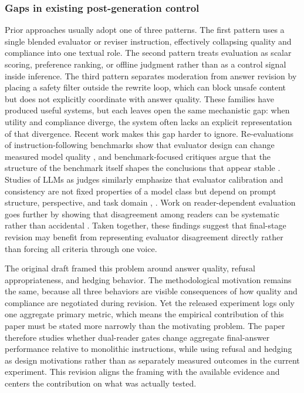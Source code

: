 \documentclass{article}
\begin{document}
\subsubsection{Gaps in existing post-generation control}

\label{sec:gaps_in_existing_post_generation_control}

Prior approaches usually adopt one of three patterns. The first pattern uses a single blended evaluator or reviser instruction, effectively collapsing quality and compliance into one textual role. The second pattern treats evaluation as scalar scoring, preference ranking, or offline judgment rather than as a control signal inside inference. The third pattern separates moderation from answer revision by placing a safety filter outside the rewrite loop, which can block unsafe content but does not explicitly coordinate with answer quality. These families have produced useful systems, but each leaves open the same mechanistic gap: when utility and compliance diverge, the system often lacks an explicit representation of that divergence. Recent work makes this gap harder to ignore. Re-evaluations of instruction-following benchmarks show that evaluator design can change measured model quality \cite{liu2024reife}, and benchmark-focused critiques argue that the structure of the benchmark itself shapes the conclusions that appear stable \cite{zhu2026benchmark}. Studies of LLMs as judges similarly emphasize that evaluator calibration and consistency are not fixed properties of a model class but depend on prompt structure, perspective, and task domain \cite{zhou2025evaluating}, \cite{zhang2024evaluation}. Work on reader-dependent evaluation goes further by showing that disagreement among readers can be systematic rather than accidental \cite{marco2025reader}. Taken together, these findings suggest that final-stage revision may benefit from representing evaluator disagreement directly rather than forcing all criteria through one voice.

The original draft framed this problem around answer quality, refusal appropriateness, and hedging behavior. The methodological motivation remains the same, because all three behaviors are visible consequences of how quality and compliance are negotiated during revision. Yet the released experiment logs only one aggregate primary metric, which means the empirical contribution of this paper must be stated more narrowly than the motivating problem. The paper therefore studies whether dual-reader gates change aggregate final-answer performance relative to monolithic instructions, while using refusal and hedging as design motivations rather than as separately measured outcomes in the current experiment. This revision aligns the framing with the available evidence and centers the contribution on what was actually tested.
\end{document}
